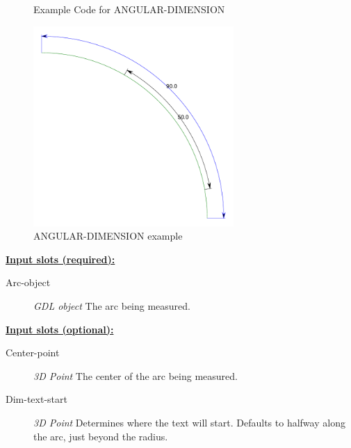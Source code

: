 \documentclass [11pt]{book}
\begin{document}
\begin{itemize}
\begin{figure}
\caption{Example Code for ANGULAR-DIMENSION}

\label{fig:example-code-ANGULAR-DIMENSION}

\end{figure}

\begin{figure}
\begin{center}
\includegraphics[width=3in,height=3in]{../images/example-ANGULAR-DIMENSION.pdf}
\end{center}

\caption{ANGULAR-DIMENSION example}

\label{fig:ANGULAR-DIMENSION}

\end{figure}





\textbf{
\underline{Input slots (required):}}

\begin{description}

\item [Arc-object]
\emph{GDL object} The arc being measured.


\end{description}






\textbf{
\underline{Input slots (optional):}}

\begin{description}

\item [Center-point]
\emph{3D Point} The center of the arc being measured.


\item [Dim-text-start]
\emph{3D Point} Determines where the text will start. Defaults to halfway along the arc, just beyond the radius.



\end{description}
\end{itemize}
\end{document}
